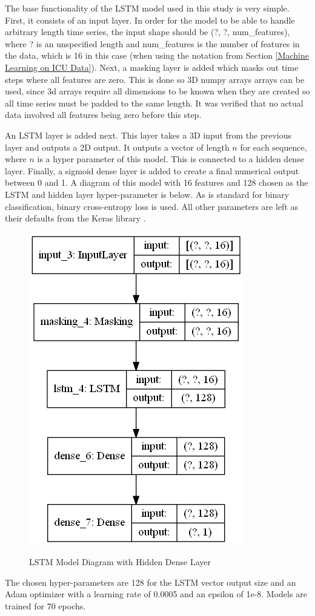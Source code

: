 \documentclass[12pt]{article}
\begin{document}
The base functionality of the LSTM model used in this study is very simple. First, it consists of an input layer. In order for the model to be able to handle arbitrary length time series, the input shape should be (?, ?, num\_features), where ? is an unspecified length and num\_features is the number of features in the data, which is 16 in this case (when using the notation from Section \ref{Machine Learning on ICU Data}). Next, a masking layer is added which masks out time steps where all features are zero. This is done so 3D numpy arrays arrays can be used, since 3d arrays require all dimensions to be known when they are created so all time series must be padded to the same length. It was verified that no actual data involved all features being zero before this step.

An LSTM layer is added next. This layer takes a 3D input from the previous layer and outputs a 2D output. It outputs a vector of length $n$ for each sequence, where $n$ is a hyper parameter of this model. This is connected to a hidden dense layer. Finally, a sigmoid dense layer is added to create a final numerical output between 0 and 1. A diagram of this model with 16 features and 128 chosen as the LSTM and hidden layer hyper-parameter is below. As is standard for binary classification, binary cross-entropy loss is used. All other parameters are left as their defaults from the Keras library \cite{keras}.

\begin{figure}[H]
\centering\caption{LSTM Model Diagram with Hidden Dense Layer}
\includegraphics[scale=0.4]{Small Model with dense.png}
\label{LSTM Model Diagram with Hidden Dense Layer}
\end{figure}
The chosen hyper-parameters are 128 for the LSTM vector output size and an Adam optimizer with a learning rate of 0.0005 and an epsilon of 1e-8. Models are trained for 70 epochs.
\end{document}
